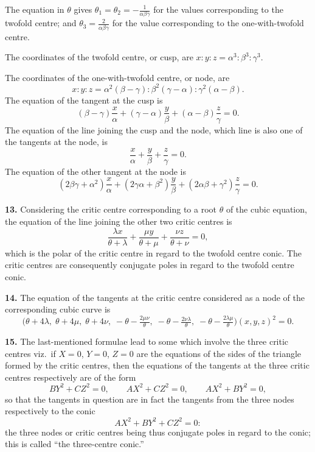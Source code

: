 \documentclass[11pt,a4paper]{article}
\begin{document}
The equation in $\theta$ gives $\theta_1 = \theta_2 = -\tfrac{1}{\alpha\beta\gamma}$ for the values corresponding to the twofold centre; and $\theta_3 = \tfrac{2}{\alpha\beta\gamma}$ for the value corresponding to the one-with-twofold centre.

The coordinates of the twofold centre, or cusp, are $x : y : z = \alpha^3 : \beta^3 : \gamma^3$.

The coordinates of the one-with-twofold centre, or node, are
\[
x : y : z = \alpha^2(\beta - \gamma) : \beta^2(\gamma - \alpha) : \gamma^2(\alpha - \beta).
\]
The equation of the tangent at the cusp is
\[
(\beta - \gamma)\frac{x}{\alpha} + (\gamma - \alpha)\frac{y}{\beta} + (\alpha - \beta)\frac{z}{\gamma} = 0.
\]
The equation of the line joining the cusp and the node, which line is also one of the tangents at the node, is
\[
\frac{x}{\alpha} + \frac{y}{\beta} + \frac{z}{\gamma} = 0.
\]
The equation of the other tangent at the node is
\[
(2\beta\gamma + \alpha^2)\frac{x}{\alpha} + (2\gamma\alpha + \beta^2)\frac{y}{\beta} + (2\alpha\beta + \gamma^2)\frac{z}{\gamma} = 0.
\]

\medskip

\textbf{13.} Considering the critic centre corresponding to a root $\theta$ of the cubic equation, the equation of the line joining the other two critic centres is
\[
\frac{\lambda x}{\theta + \lambda} + \frac{\mu y}{\theta + \mu} + \frac{\nu z}{\theta + \nu} = 0,
\]
which is the polar of the critic centre in regard to the twofold centre conic. The critic centres are consequently conjugate poles in regard to the twofold centre conic.

\medskip

\textbf{14.} The equation of the tangents at the critic centre considered as a node of the corresponding cubic curve is
\[
\bigl(\theta + 4\lambda,\;\theta + 4\mu,\;\theta + 4\nu,\;-\theta - \tfrac{2\mu\nu}{\theta},\;-\theta - \tfrac{2\nu\lambda}{\theta},\;-\theta - \tfrac{2\lambda\mu}{\theta}\bigr)(x, y, z)^2 = 0.
\]

\medskip

\textbf{15.} The last-mentioned formulae lead to some which involve the three critic centres viz.\ if $X = 0$, $Y = 0$, $Z = 0$ are the equations of the sides of the triangle formed by the critic centres, then the equations of the tangents at the three critic centres respectively are of the form
\[
BY^2 + CZ^2 = 0,\qquad AX^2 + CZ^2 = 0,\qquad AX^2 + BY^2 = 0,
\]
so that the tangents in question are in fact the tangents from the three nodes respectively to the conic
\[
AX^2 + BY^2 + CZ^2 = 0:
\]
the three nodes or critic centres being thus conjugate poles in regard to the conic; this is called ``the three-centre conic.''
\end{document}
